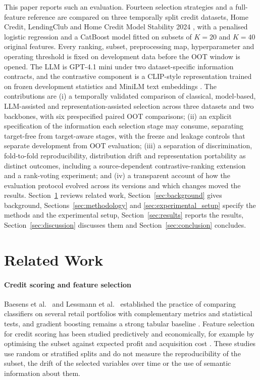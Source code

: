\documentclass[final,5p,twocolumn]{elsarticle}
\newcommand{\Kfeat}{K}
\begin{document}
This paper reports such an evaluation. Fourteen selection strategies and a full-feature reference are compared on three temporally split credit datasets, Home Credit, LendingClub and Home Credit Model Stability 2024 \cite{homecredit2018,lendingclub_kaggle,homecredit2024}, with a penalised logistic regression and a CatBoost model \cite{prokhorenkova2018} fitted on subsets of $\Kfeat=20$ and $\Kfeat=40$ original features. Every ranking, subset, preprocessing map, hyperparameter and operating threshold is fixed on development data before the OOT window is opened. The LLM is GPT-4.1 mini \cite{openai2025gpt41} under two dataset-specific information contracts, and the contrastive component is a CLIP-style representation trained on frozen development statistics and MiniLM text embeddings \cite{wang2020minilm,reimers2019}. The contributions are (i) a temporally validated comparison of classical, model-based, LLM-assisted and representation-assisted selection across three datasets and two backbones, with six prespecified paired OOT comparisons; (ii) an explicit specification of the information each selection stage may consume, separating target-free from target-aware stages, with the freeze and leakage controls that separate development from OOT evaluation; (iii) a separation of discrimination, fold-to-fold reproducibility, distribution drift and representation portability as distinct outcomes, including a source-dependent contrastive-ranking extension and a rank-voting experiment; and (iv) a transparent account of how the evaluation protocol evolved across its versions and which changes moved the results. Section~\ref{sec:related_work} reviews related work, Section~\ref{sec:background} gives background, Sections~\ref{sec:methodology} and \ref{sec:experimental_setup} specify the methods and the experimental setup, Section~\ref{sec:results} reports the results, Section~\ref{sec:discussion} discusses them and Section~\ref{sec:conclusion} concludes.


\section{Related Work}
\label{sec:related_work}

\paragraph{Credit scoring and feature selection}
Baesens et al.\ \cite{baesens2003} and Lessmann et al.\ \cite{lessmann2015} established the practice of comparing classifiers on several retail portfolios with complementary metrics and statistical tests, and gradient boosting remains a strong tabular baseline \cite{gunnarsson2021}. Feature selection for credit scoring has been studied predictively and economically, for example by optimising the subset against expected profit and acquisition cost \cite{maldonado2017}. These studies use random or stratified splits and do not measure the reproducibility of the subset, the drift of the selected variables over time or the use of semantic information about them.
\end{document}
